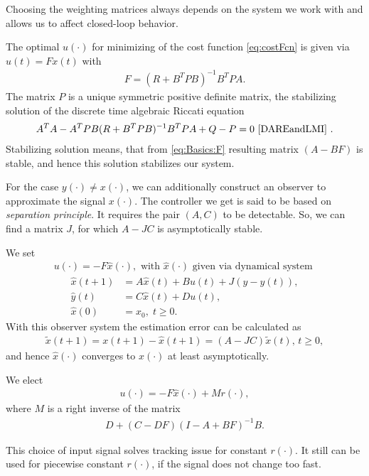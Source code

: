 Choosing the weighting matrices always depends on the system we work with and allows us to affect closed-loop behavior.   

The optimal $u(\cdot)$ for minimizing of the cost function \eqref{eq:costFcn} is given via $u(t) = F x(t)$ with
\begin{align}
\label{eq:Basics:F}
F = (R + B^T P B)^{-1}B^TPA.
\end{align}
The matrix $P$ is a unique symmetric positive definite matrix, the stabilizing solution of the discrete time algebraic Riccati equation
\begin{align}
 A^TA - A^T P B (R + B^T P B)^{-1} B^T P A + Q - P = 0 \text{ \cite{DAREandLMI} }.
\end{align}
Stabilizing solution means, that from \eqref{eq:Basics:F} resulting matrix $(A - BF)$ is stable, and hence this solution stabilizes our system. 


For the case $y(\cdot) \neq x(\cdot)$, we can additionally construct an observer to approximate the signal $x(\cdot)$. The  controller we get is said to be based on \textit{separation principle}.
It requires the pair $(A,C)$ to be detectable. So, we can find a matrix $J$, for which $A - JC$ is asymptotically stable.

We set 
\begin{align}
u(\cdot)= -F \hat{x}(\cdot), \text{ with } \hat{x}(\cdot) \text{ given via dynamical system }
\end{align}
\begin{align}
\hat{x}(t+1) &= A\hat{x}(t) + B u(t) + J (y - \hat{y}(t)), \\
\hat{y}(t) & = C\hat{x}(t) + D u(t), \\
\hat{x}(0)& = x_0, \; t \geq 0. 
\end{align}
With this observer system the estimation error can be calculated as \begin{align}
\tilde{x}(t+1) = x(t+1) - \hat{x}(t+1) = (A - JC) \tilde{x}(t), \, t \geq 0,
\end{align} and hence $\hat{x} (\cdot)$ converges to $x(\cdot)$ at least asymptotically. 

We elect
\begin{align}
u(\cdot) = -F\hat{x}(\cdot) + Mr(\cdot), 
\end{align}
where $M$ is a right inverse of the matrix 
\begin{align}
D + (C - D F) (I - A + B F)^{-1} B.
\end{align}

This choice of input signal 
solves tracking issue for constant $r(\cdot)$. It still can be used for piecewise constant $r(\cdot)$, if the signal does not change too fast.
